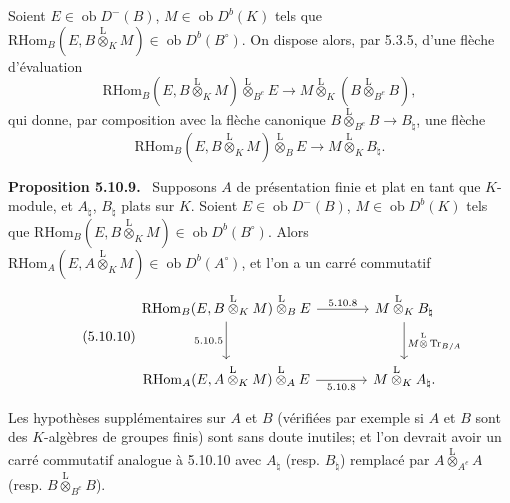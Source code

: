 \documentclass[11pt]{article}
\newenvironment{statement}[1]{\par\medskip\noindent\textbf{#1.}\ }{\par\medskip}
\newcommand{\ob}{\operatorname{ob}}
\providecommand{\RHom}{\mathrm{RHom}}
\providecommand{\Tr}{\operatorname{Tr}}
\providecommand{\Tr}{\operatorname{Tr}}
\providecommand{\lten}{\overset{\mathrm L}{\otimes}}
\providecommand{\Tr}{\operatorname{Tr}}
\providecommand{\RHom}{\mathrm{RHom}}
\providecommand{\ob}{\operatorname{ob}}
\providecommand{\lten}{\overset{\mathrm L}{\otimes}}
\providecommand{\RHom}{\mathrm R\mathcal{H}om}
\providecommand{\lten}{\overset{\mathrm L}{\otimes}}
\providecommand{\Tr}{\operatorname{Tr}}
\providecommand{\lten}{\overset{\mathrm L}{\otimes}}
\providecommand{\lten}{\overset{\mathrm L}{\otimes}}
\providecommand{\lten}{\overset{\mathrm L}{\otimes}}
\begin{document}
Soient $E\in\ob D^-(B)$, $M\in\ob D^b(K)$ tels que $\RHom_B(E,B\lten_KM)\in\ob D^b(B^\circ)$. On dispose alors, par 5.3.5, d'une flèche d'évaluation
\[
\RHom_B(E,B\lten_KM)\lten_{B^e}E\longrightarrow M\lten_K(B\lten_{B^e}B),
\]
qui donne, par composition avec la flèche canonique $B\lten_{B^e}B\to B_\natural$, une flèche
\begin{equation}\tag{5.10.8}
\RHom_B(E,B\lten_KM)\lten_BE\longrightarrow M\lten_KB_\natural.
\end{equation}

\begin{statement}{Proposition 5.10.9}
Supposons $A$ de présentation finie et plat en tant que $K$-module, et $A_\natural$, $B_\natural$ plats sur $K$. Soient $E\in\ob D^-(B)$, $M\in\ob D^b(K)$ tels que $\RHom_B(E,B\lten_KM)\in\ob D^b(B^\circ)$. Alors $\RHom_A(E,A\lten_KM)\in\ob D^b(A^\circ)$, et l'on a un carré commutatif
\begin{equation}\tag{5.10.10}
\begin{tikzcd}[column sep=large,row sep=large]
\RHom_B(E,B\lten_KM)\lten_BE \arrow[r,"5.10.8"] \arrow[d,"5.10.5"'] & M\lten_KB_\natural \arrow[d,"M\lten\Tr_{B/A}"]\\
\RHom_A(E,A\lten_KM)\lten_AE \arrow[r,"5.10.8"'] & M\lten_KA_\natural .
\end{tikzcd}
\end{equation}
\end{statement}

Les hypothèses supplémentaires sur $A$ et $B$ (vérifiées par exemple si $A$ et $B$ sont des $K$-algèbres de groupes finis) sont sans doute inutiles; et l'on devrait avoir un carré commutatif analogue à 5.10.10 avec $A_\natural$ (resp. $B_\natural$) remplacé par $A\lten_{A^e}A$ (resp. $B\lten_{B^e}B$).
\end{document}
